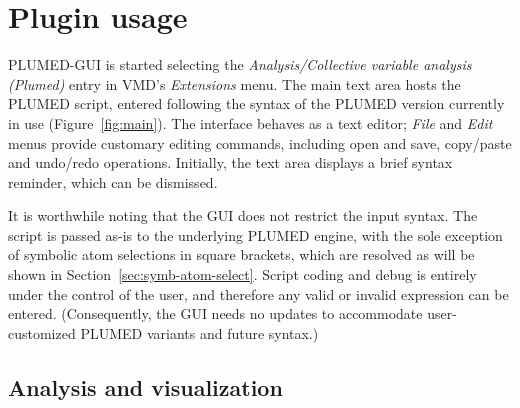 \documentclass[preprint,review,11pt]{elsarticle}
\begin{document}





\section{Plugin usage}

PLUMED-GUI is started selecting the \emph{Analysis/Collective variable
  analysis (Plumed)} entry in VMD's \emph{Extensions} menu. The main
text area hosts the PLUMED script, entered following the syntax of the
PLUMED version currently in use (Figure~\ref{fig:main}).  The
interface behaves as a text editor; \emph{File} and \emph{Edit} menus
provide customary editing commands, including open and save,
copy/paste and undo/redo operations.  Initially, the text area
displays a brief syntax reminder, which can be dismissed.


It is worthwhile noting that the GUI does not restrict the input
syntax. The script is passed as-is to the underlying PLUMED engine,
with the sole exception of symbolic atom selections in square
brackets, which are resolved as will be shown in
Section~\ref{sec:symb-atom-select}.  Script coding and debug is
entirely under the control of the user, and therefore any valid or
invalid expression can be entered.  (Consequently, the GUI needs no
updates to accommodate user-customized PLUMED variants and future
syntax.)




\subsection{Analysis and visualization}
\end{document}
